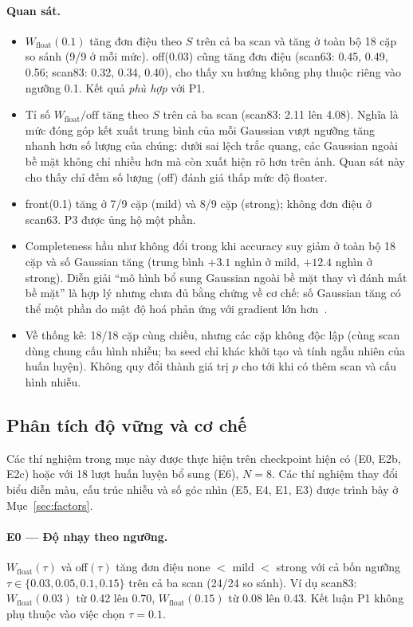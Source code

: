 \documentclass[11pt,a4paper]{article}
\begin{document}
\paragraph{Quan sát.}
\begin{itemize}
  \item $W_{\text{float}}(0.1)$ tăng đơn điệu theo $S$ trên cả ba scan và tăng ở toàn bộ 18 cặp so sánh (9/9 ở mỗi mức). off(0.03) cũng tăng đơn điệu (scan63: 0.45, 0.49, 0.56; scan83: 0.32, 0.34, 0.40), cho thấy xu hướng không phụ thuộc riêng vào ngưỡng 0.1. Kết quả \emph{phù hợp} với P1.
  \item Tỉ số $W_{\text{float}}/\text{off}$ tăng theo $S$ trên cả ba scan (scan83: 2.11 lên 4.08). Nghĩa là mức đóng góp kết xuất trung bình của mỗi Gaussian vượt ngưỡng tăng nhanh hơn số lượng của chúng: dưới sai lệch trắc quang, các Gaussian ngoài bề mặt không chỉ nhiều hơn mà còn xuất hiện rõ hơn trên ảnh. Quan sát này cho thấy chỉ đếm số lượng (off) đánh giá thấp mức độ floater.
  \item front(0.1) tăng ở 7/9 cặp (mild) và 8/9 cặp (strong); không đơn điệu ở scan63. P3 được ủng hộ một phần.
  \item Completeness hầu như không đổi trong khi accuracy suy giảm ở toàn bộ 18 cặp và số Gaussian tăng (trung bình $+3.1$ nghìn ở mild, $+12.4$ nghìn ở strong). Diễn giải ``mô hình bổ sung Gaussian ngoài bề mặt thay vì đánh mất bề mặt'' là hợp lý nhưng chưa đủ bằng chứng về cơ chế: số Gaussian tăng có thể một phần do mật độ hoá phản ứng với gradient lớn hơn~\cite{adgs}.
  \item Về thống kê: 18/18 cặp cùng chiều, nhưng các cặp không độc lập (cùng scan dùng chung cấu hình nhiễu; ba seed chỉ khác khởi tạo và tính ngẫu nhiên của huấn luyện). Không quy đổi thành giá trị $p$ cho tới khi có thêm scan và cấu hình nhiễu.
\end{itemize}

\subsection{Phân tích độ vững và cơ chế}
\label{sec:robust}
Các thí nghiệm trong mục này được thực hiện trên checkpoint hiện có (E0, E2b, E2c) hoặc với 18 lượt huấn luyện bổ sung (E6), $N=8$. Các thí nghiệm thay đổi biểu diễn màu, cấu trúc nhiễu và số góc nhìn (E5, E4, E1, E3) được trình bày ở Mục~\ref{sec:factors}.

\paragraph{E0 --- Độ nhạy theo ngưỡng.} $W_{\text{float}}(\tau)$ và off$(\tau)$ tăng đơn điệu none $<$ mild $<$ strong với cả bốn ngưỡng $\tau\in\{0.03, 0.05, 0.1, 0.15\}$ trên cả ba scan (24/24 so sánh). Ví dụ scan83: $W_{\text{float}}(0.03)$ từ 0.42 lên 0.70, $W_{\text{float}}(0.15)$ từ 0.08 lên 0.43. Kết luận P1 không phụ thuộc vào việc chọn $\tau=0.1$.
\end{document}
